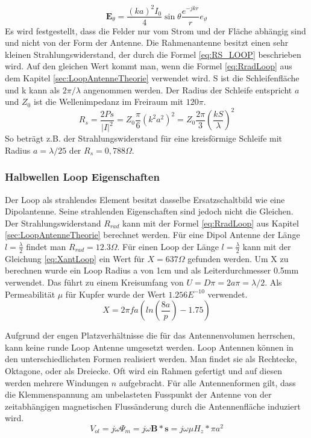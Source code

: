 \begin{equation}
\textbf{E}_{\theta}=\dfrac{(ka)^2I_{0}}{4}\sin \theta \dfrac{e^{-jkr}}{r} e_{\vartheta}
\end{equation}
Es wird festgestellt, dass die Felder nur vom Strom und der Fläche abhängig sind
und nicht von der Form der Antenne. 
Die Rahmenantenne besitzt einen sehr kleinen Strahlungswiderstand, der durch die
Formel \ref{eq:RS_LOOP} beschrieben wird. Auf den gleichen Wert kommt man, wenn die Formel \ref{eq:RradLoop} aus dem Kapitel \ref{sec:LoopAntenneTheorie} verwendet wird. S ist die Schleifenfläche und k kann als $2\pi/\lambda$ angenommen werden. Der Radius der Schleife entspricht $a$ und $Z_0$ ist die Wellenimpedanz im Freiraum mit $120\pi$.
\begin{equation}\label{eq:RS_LOOP}
R_{s}=\dfrac{2Ps}{|I|^{2}}=Z_{0}\dfrac{\pi}{6}(k^{2}a^{2})^{2}=Z_{0}\dfrac{2\pi}{3}\left(\dfrac{kS}{\lambda}\right)^{2} 
\end{equation}
So beträgt z.B. der Strahlungswiderstand für eine kreisförmige Schleife mit Radius $a = \lambda/25$ der  $R_{s} = 0,788\Omega$.


\subsubsection{Halbwellen Loop Eigenschaften}
Der Loop als strahlendes Element besitzt dasselbe Ersatzschaltbild wie eine Dipolantenne. Seine strahlenden Eigenschaften sind jedoch nicht die Gleichen. Der Strahlungswiderstand $R_{rad}$ kann mit der Formel \ref{eq:RradLoop} aus Kapitel \ref{sec:LoopAntenneTheorie} berechnet werden. Für eine Dipol Antenne der Länge $l=\frac{\lambda}{2}$ findet man $R_{rad} = 12.3\Omega$. Für einen Loop der Länge $l=\frac{\lambda}{2}$ kann mit der Gleichung \ref{eq:XantLoop} ein Wert für $X = 637 \Omega$ gefunden werden. Um X zu berechnen wurde ein Loop Radius a von 1cm und als Leiterdurchmesser 0.5mm verwendet. Das führt zu einem Kreisumfang von $U=D\pi=2a\pi=\lambda /2$. Als Permeabilität $\mu $ für Kupfer wurde der Wert $1.256E^{-10}$ verwendet.
\begin{equation}\label{eq:XantLoop}
X= 2\pi f a(ln \left( \frac{8a}{p} \right) - 1.75)
\end{equation}

Aufgrund der engen Platzverhältnisse die für das Antennenvolumen herrschen, kann keine runde Loop Antenne umgesetzt werden. Loop Antennen können in den unterschiedlichsten Formen realisiert werden. Man findet sie als Rechtecke, Oktagone, oder als Dreiecke. Oft wird ein Rahmen gefertigt und auf diesen  werden mehrere Windungen $n$ aufgebracht. Für alle Antennenformen gilt, dass die Klemmenspannung am unbelasteten Fusspunkt der Antenne von der zeitabhängigen magnetischen Flussänderung durch die Antennenfläche induziert wird.
\begin{equation}\label{eq:InduktionspannungLoop}
V_{ol}= j\omega\Psi_{m}=j\omega\textbf{B}*\textbf{s}= j\omega\mu H_{z}*\pi a^{2}
\end{equation}

